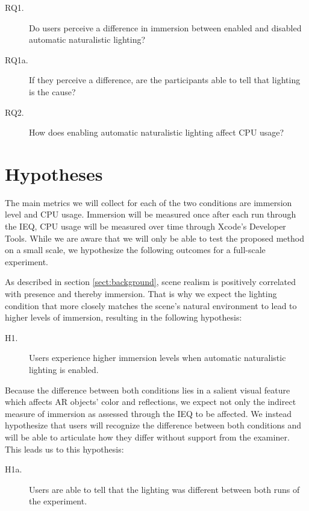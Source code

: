 \documentclass[12pt,twoside,english]{article}
\begin{document}
\begin{description}
    \item[RQ1.] Do users perceive a difference in immersion between enabled and disabled automatic naturalistic lighting?
    \item[RQ1a.] If they perceive a difference, are the participants able to tell that lighting is the cause?
    \item[RQ2.] How does enabling automatic naturalistic lighting affect \gls{CPU} usage?
\end{description}

\section{Hypotheses}
\label{sect:hypotheses}

The main metrics we will collect for each of the two conditions are immersion level and \gls{CPU} usage.
Immersion will be measured once after each run through the \gls{IEQ}, \gls{CPU} usage will be measured over time through Xcode's Developer Tools.
While we are aware that we will only be able to test the proposed method on a small scale, we hypothesize the following outcomes for a full-scale experiment.

As described in section \ref{sect:background}, scene realism is positively correlated with presence and thereby immersion.
That is why we expect the lighting condition that more closely matches the scene's natural environment to lead to higher levels of immersion, resulting in the following hypothesis:

\begin{description}
    \item[H1.] Users experience higher immersion levels when automatic naturalistic lighting is enabled.
\end{description}

Because the difference between both conditions lies in a salient visual feature which affects \gls{AR} objects' color and reflections, we expect not only the indirect measure of immersion as assessed through the \gls{IEQ} to be affected.
We instead hypothesize that users will recognize the difference between both conditions and will be able to articulate how they differ without support from the examiner.
This leads us to this hypothesis:

\begin{description}
    \item[H1a.] Users are able to tell that the lighting was different between both runs of the experiment.
\end{description}
\end{document}
